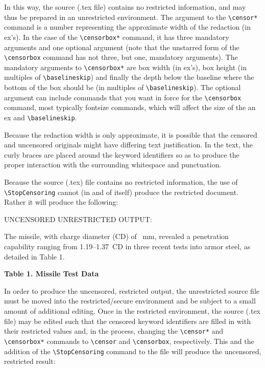 \documentclass{article}
\begin{document}
In this way, the source (.tex file) contains no restricted information,
and may thus be prepared in an unrestricted environment.  The argument
to the \verb|\censor*| command is a number representing the approximate
width of the redaction (in ex's).  In the case of the \verb|\censorbox*|
command, it has three mandatory arguments and one optional argument
(note that the unstarred form of the \verb|\censorbox| command has not
three, but one, mandatory arguments).  The mandatory arguments to
\verb|\censorbox*| are box width (in ex's), box height (in multiples of
\verb|\baselineskip|) and finally the depth below the baseline where the
bottom of the box should be (in multiples of \verb|\baselineskip|).  The
optional argument can include commands that you want in force for the
\verb|\censorbox| command, most typically fontsize commands, which will
affect the size of the an ex and \verb|\baselineskip|.

Because the redaction width is only approximate, it is possible that the
censored and uncensored originals might have differing text
justification.  In the text, the curly braces are placed around the
keyword identifiers so as to produce the proper interaction with the
surrounding whitespace and punctuation.

Because the source (.tex) file contains no restricted information, the
use of \verb|\StopCensoring| cannot (in and of itself) produce the
restricted document.  Rather it will produce the following:

{\addtolength{\leftskip}{2.3em}
UNCENSORED UNRESTRICTED OUTPUT: \hrulefill

\StopCensoring

\def\Missile{\censor*{7}}
\def\Size{\censor*{2}}
\def\TableOne{\censorbox*[\small]{26}{5}{3.5}}

The {\Missile} missile, with charge diameter (CD) of {\Size}~mm, revealed a
penetration capability ranging from 1.19--1.37~CD in three recent tests
into armor steel, as detailed in Table 1.

\begin{table}[ht]
\begin{center}
\textbf{Table 1. {\Missile} Missile Test Data}\\
{\TableOne}
\end{center}
\end{table}

\hrulefill

}

In order to produce the uncensored, restricted output, the unrestricted
source file must be moved into the restricted/secure environment and be
subject to a small amount of additional editing.  Once in the restricted
environment, the source (.tex file) may be edited such that the censored
keyword identifiers are filled in with their restricted values and, in
the process, changing the \verb|\censor*| and \verb|\censorbox*|
commands to \verb|\censor| and \verb|\censorbox|, respectively.  This
and the addition of the \verb|\StopCensoring| command to the file will
produce the uncensored, restricted result:
\end{document}
